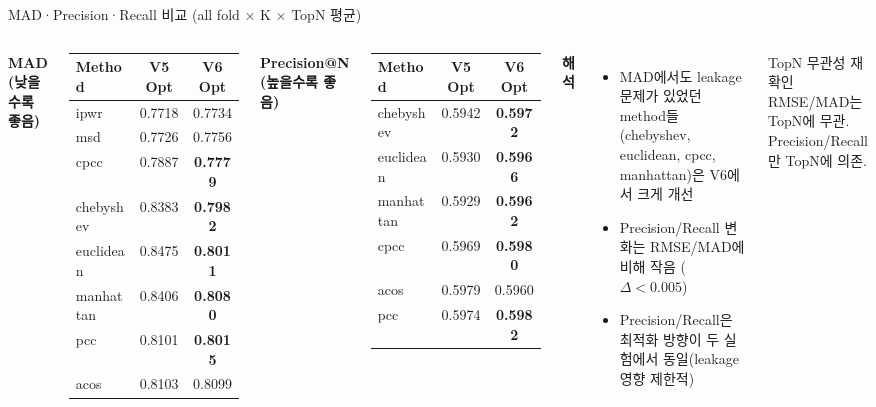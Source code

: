 \documentclass[aspectratio=169,10pt]{beamer}
\begin{document}
\begin{frame}[shrink=5]{MAD·Precision·Recall 비교 \textnormal{\small(all fold $\times$ K $\times$ TopN 평균)}}
	\begin{columns}[T]
			\textbf{MAD (낮을수록 좋음)}
			\renewcommand{\arraystretch}{1.1}
			{\small
			\begin{tabular}{l|c|c}
				\toprule
				Method & V5 Opt & V6 Opt \\
				\midrule
				ipwr   & 0.7718 & 0.7734 \\
				msd    & 0.7726 & 0.7756 \\
				cpcc   & 0.7887 & \textbf{0.7779} \\
				chebyshev & 0.8383 & \textbf{0.7982} \\
				euclidean & 0.8475 & \textbf{0.8011} \\
				manhattan & 0.8406 & \textbf{0.8080} \\
				pcc    & 0.8101 & \textbf{0.8015} \\
				acos   & 0.8103 & 0.8099 \\
				\bottomrule
			\end{tabular}
			}

			\textbf{Precision@N (높을수록 좋음)}
			\renewcommand{\arraystretch}{1.1}
			{\small
			\begin{tabular}{l|c|c}
				\toprule
				Method & V5 Opt & V6 Opt \\
				\midrule
				chebyshev & 0.5942 & \textbf{0.5972} \\
				euclidean & 0.5930 & \textbf{0.5966} \\
				manhattan & 0.5929 & \textbf{0.5962} \\
				cpcc   & 0.5969 & \textbf{0.5980} \\
				acos   & 0.5979 & 0.5960 \\
				pcc    & 0.5974 & \textbf{0.5982} \\
				\bottomrule
			\end{tabular}
			}

			\textbf{해석}
			\begin{itemize}
				\item MAD에서도 leakage 문제가 있었던 method들(chebyshev, euclidean, cpcc, manhattan)은 V6에서 크게 개선
				\item Precision/Recall 변화는 RMSE/MAD에 비해 작음 ($\Delta < 0.005$)
				\item Precision/Recall은 최적화 방향이 두 실험에서 동일(leakage 영향 제한적)
			\end{itemize}

			\vspace{0.4em}
			\begin{block}{TopN 무관성 재확인}
				RMSE/MAD는 TopN에 무관.\\
				Precision/Recall만 TopN에 의존.
			\end{block}
	\end{columns}
\end{frame}
\end{document}
